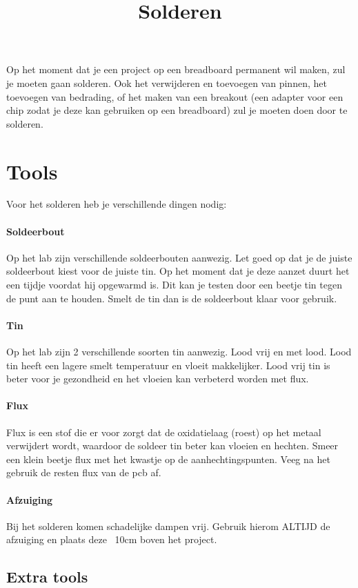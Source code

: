 \documentclass{guide}
\title{Solderen}
\begin{document}
Op het moment dat je een project op een breadboard permanent wil maken, zul je moeten gaan solderen. Ook het verwijderen en toevoegen van pinnen, het toevoegen van bedrading, of het maken van een breakout (een adapter voor een chip zodat je deze kan gebruiken op een breadboard) zul je moeten doen door te solderen.
\section{Tools}
Voor het solderen heb je verschillende dingen nodig:

\paragraph{Soldeerbout} Op het lab zijn verschillende soldeerbouten aanwezig. Let goed op dat je de juiste soldeerbout kiest voor de juiste tin. Op het moment dat je deze aanzet duurt het een tijdje voordat hij opgewarmd is. Dit kan je testen door een beetje tin tegen de punt aan te houden. Smelt de tin dan is de soldeerbout klaar voor gebruik.

\paragraph{Tin} Op het lab zijn 2 verschillende soorten tin aanwezig. Lood vrij en met lood. Lood tin heeft een lagere smelt temperatuur en vloeit makkelijker. Lood vrij tin is beter voor je gezondheid en het vloeien kan verbeterd worden met flux.

\paragraph{Flux} Flux is een stof die er voor zorgt dat de oxidatielaag (roest) op het metaal verwijdert wordt, waardoor de soldeer tin beter kan vloeien en hechten. Smeer een klein beetje flux met het kwastje op de aanhechtingspunten. Veeg na het gebruik de resten flux van de pcb af.

\paragraph{Afzuiging}
Bij het solderen komen schadelijke dampen vrij. Gebruik hierom ALTIJD de afzuiging en plaats deze ~10cm boven het project.
\subsection{Extra tools}
\end{document}
